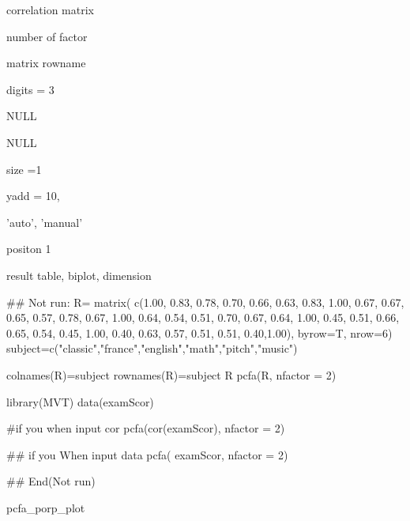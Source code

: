 \documentclass[a4paper]{book}
\begin{document}
\begin{Arguments}
\begin{ldescription}
\item[\code{R}] correlation matrix

\item[\code{nfactor}] number of factor

\item[\code{rowname}] matrix rowname

\item[\code{digits}] digits = 3

\item[\code{xlim}] NULL

\item[\code{ylim}] NULL

\item[\code{cex}] size =1

\item[\code{yadd}] yadd = 10,

\item[\code{name}] 'auto', 'manual'

\item[\code{pos}] positon  1
\end{ldescription}
\end{Arguments}
%
\begin{Value}
result table, biplot, dimension
\end{Value}
%
\begin{Examples}
\begin{ExampleCode}
\#\# Not run: 
R= matrix(
c(1.00, 0.83, 0.78, 0.70, 0.66, 0.63,
  0.83, 1.00, 0.67, 0.67, 0.65, 0.57,
  0.78, 0.67, 1.00, 0.64, 0.54, 0.51,
  0.70, 0.67, 0.64, 1.00, 0.45, 0.51,
  0.66, 0.65, 0.54, 0.45, 1.00, 0.40,
  0.63, 0.57, 0.51, 0.51, 0.40,1.00),
 byrow=T, nrow=6)
subject=c("classic","france","english","math","pitch","music")

colnames(R)=subject
rownames(R)=subject
R
pcfa(R, nfactor = 2)

library(MVT)
data(examScor)

#if you when input cor
pcfa(cor(examScor), nfactor = 2)

## if you When input data
pcfa( examScor, nfactor = 2)


## End(Not run)

\end{ExampleCode}
\end{Examples}
%
\begin{Description}
pcfa\_porp\_plot
\end{Description}
\end{document}
